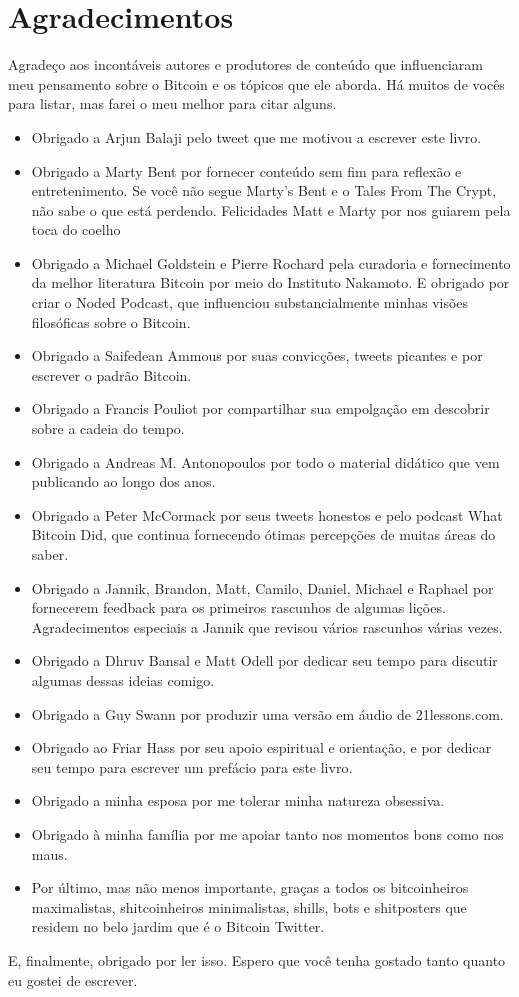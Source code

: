 \chapter*{Agradecimentos}

Agradeço aos incontáveis autores e produtores de conteúdo que influenciaram meu pensamento sobre o Bitcoin e os tópicos que ele aborda. Há muitos de vocês para listar, mas farei o meu melhor para citar alguns.

\begin{itemize}
  \item Obrigado a Arjun Balaji pelo tweet que me motivou a escrever este livro.
  \item Obrigado a Marty Bent por fornecer conteúdo sem fim para reflexão e entretenimento. Se você não segue Marty’s Bent e o Tales From The Crypt, não sabe o que está perdendo. Felicidades Matt e Marty por nos guiarem pela toca do coelho
  \item Obrigado a Michael Goldstein e Pierre Rochard pela curadoria e fornecimento da melhor literatura Bitcoin por meio do Instituto Nakamoto. E obrigado por criar o Noded Podcast, que influenciou substancialmente minhas visões filosóficas sobre o Bitcoin.
  \item Obrigado a Saifedean Ammous por suas convicções, tweets picantes e por escrever o padrão Bitcoin.
  \item Obrigado a Francis Pouliot por compartilhar sua empolgação em descobrir sobre a cadeia do tempo.
  \item Obrigado a Andreas M. Antonopoulos por todo o material didático que vem publicando ao longo dos anos.
  \item Obrigado a Peter McCormack por seus tweets honestos e pelo podcast What Bitcoin Did, que continua fornecendo ótimas percepções de muitas áreas do saber.
  \item Obrigado a Jannik, Brandon, Matt, Camilo, Daniel, Michael e Raphael por fornecerem feedback para os primeiros rascunhos de algumas lições. Agradecimentos especiais a Jannik que revisou vários rascunhos várias vezes.
  \item Obrigado a Dhruv Bansal e Matt Odell por dedicar seu tempo para discutir algumas dessas ideias comigo.
  \item Obrigado a Guy Swann por produzir uma versão em áudio de 21lessons.com.
  \item Obrigado ao Friar Hass por seu apoio espiritual e orientação, e por dedicar seu tempo para escrever um prefácio para este livro.
  \item Obrigado a minha esposa por me tolerar minha natureza obsessiva.
  \item Obrigado à minha família por me apoiar tanto nos momentos bons como nos maus.
  \item Por último, mas não menos importante, graças a todos os bitcoinheiros maximalistas, shitcoinheiros minimalistas, shills, bots e shitposters que residem no belo jardim que é o Bitcoin Twitter.
\end{itemize}

E, finalmente, obrigado por ler isso. Espero que você tenha gostado tanto quanto eu gostei de escrever.